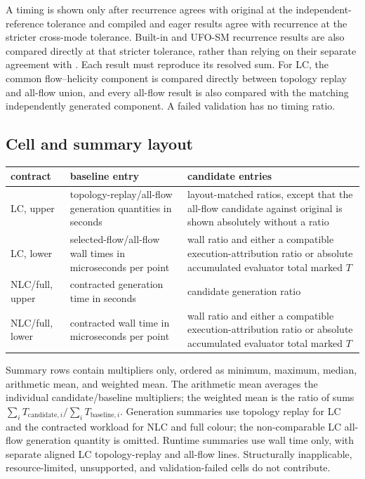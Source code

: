 A timing is shown only after recurrence agrees with original \AC{} at the
independent-reference tolerance and compiled and eager results agree with
recurrence at the stricter cross-mode tolerance. Built-in and UFO-SM recurrence
results are also compared directly at that stricter tolerance, rather than
relying on their separate agreement with \AC{}. Each result must reproduce its
resolved sum. For LC, the common flow--helicity component is compared directly
between topology replay and all-flow union, and every \PAC{} all-flow result is
also compared with the matching independently generated \AC{} component. A
failed validation has no timing ratio.

\subsection*{Cell and summary layout}

\begin{center}
\small
\begin{tabular}{@{}L{0.95in}L{2.45in}L{5.75in}@{}}
\toprule
\textbf{contract} & \textbf{baseline entry} & \textbf{candidate entries} \\
\midrule
LC, upper
  & topology-replay/all-flow generation quantities in seconds
  & layout-matched ratios, except that the all-flow candidate against original
    \AC{} is shown absolutely without a ratio \\
LC, lower
  & selected-flow/all-flow wall times in microseconds per point
  & wall ratio and either a compatible execution-attribution ratio or absolute
    accumulated evaluator total marked \(T\) \\
NLC/full, upper
  & contracted generation time in seconds
  & candidate generation ratio \\
NLC/full, lower
  & contracted wall time in microseconds per point
  & wall ratio and either a compatible execution-attribution ratio or absolute
    accumulated evaluator total marked \(T\) \\
\bottomrule
\end{tabular}
\end{center}

Summary rows contain multipliers only, ordered as minimum, maximum, median,
arithmetic mean, and weighted mean.  The arithmetic mean averages the
individual candidate/baseline multipliers; the weighted mean is the ratio of
sums
\(\sum_i T_{\mathrm{candidate},i}/\sum_i T_{\mathrm{baseline},i}\).
Generation summaries use topology replay for LC and the contracted workload
for NLC and full colour; the non-comparable LC all-flow generation quantity is
omitted.  Runtime summaries use wall time only, with separate aligned LC
topology-replay and all-flow lines.  Structurally inapplicable,
resource-limited, unsupported, and validation-failed cells do not contribute.

